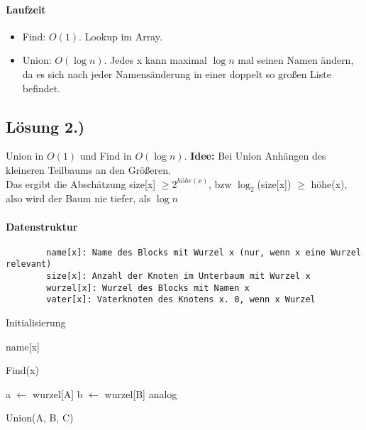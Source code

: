     \paragraph{Laufzeit}
    \begin{itemize}
        \item[] Find: $ O(1) $. Lookup im Array.
        \item[] Union: $ O(\log n) $. Jedes x kann maximal $ \log n $ mal seinen Namen ändern, da es sich nach jeder Namensänderung in einer doppelt so großen Liste befindet.
    \end{itemize}
    
    
    \subsection*{Lösung 2.)}
    Union in $ O(1) $ und Find in $ O(\log n) $. \textbf{Idee:} Bei Union Anhängen des kleineren Teilbaums an den Größeren.\\
    Das ergibt die Abschätzung size[x] $ \geq 2^{höhe(x)} $, bzw $\log_2$(size[x]) $\geq$ höhe(x), also wird der Baum nie tiefer, als $ \log n $
    \paragraph{Datenstruktur}
    \begin{verbatim}
        name[x]: Name des Blocks mit Wurzel x (nur, wenn x eine Wurzel relevant)
        size[x]: Anzahl der Knoten im Unterbaum mit Wurzel x
        wurzel[x]: Wurzel des Blocks mit Namen x
        vater[x]: Vaterknoten des Knotens x. 0, wenn x Wurzel
    \end{verbatim}
    \begin{algorithm}[H]
    \SetAlgoLined
    \caption{Initialisierung}
    \end{algorithm}
    \vspace{5mm}
    \begin{algorithm}[H]
    \SetAlgoLined
    \Return name[x]\;
    \caption{Find(x)}
    \end{algorithm}
    \vspace{5mm}
    \begin{algorithm}[H]
    \SetAlgoLined
    a $ \gets $ wurzel[A]\;
    b $ \gets $ wurzel[B]\;
     {
        analog\;
    }
    \caption{Union(A, B, C)}
    \end{algorithm}
    
